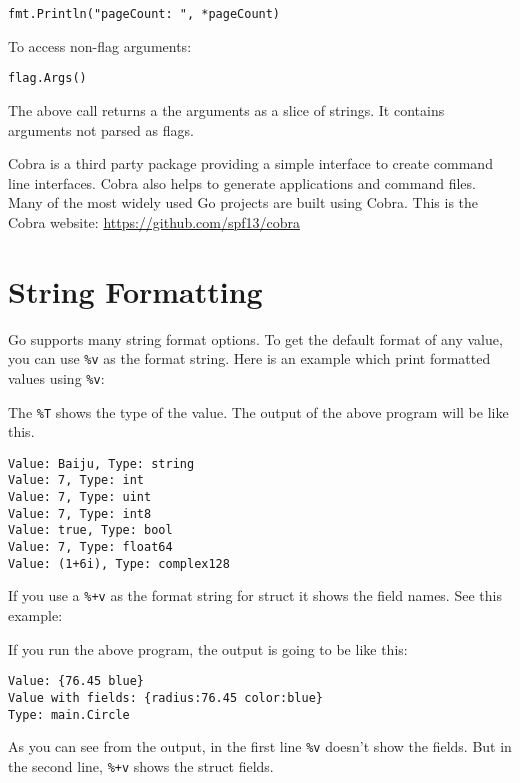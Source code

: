 \begin{lstlisting}[numbers=none]
fmt.Println("pageCount: ", *pageCount)
\end{lstlisting}

To access non-flag arguments:

\begin{lstlisting}[numbers=none]
flag.Args()
\end{lstlisting}

The above call returns a the arguments as a slice of strings.  It
contains arguments not parsed as flags.

Cobra is a third party package providing a simple interface to create
command line interfaces.  Cobra also helps to generate applications
and command files.  Many of the most widely used Go projects are built
using Cobra.  This is the Cobra
website: \url{https://github.com/spf13/cobra}

\section{String Formatting}

Go supports many string format options.  To
get the default format of any value, you can use \texttt{\%v} as the
format string.  Here is an example which print formatted values
using \texttt{\%v}:



The \texttt{\%T} shows the type of the value.  The output of the above
program will be like this.

\begin{lstlisting}[numbers=none]
Value: Baiju, Type: string
Value: 7, Type: int
Value: 7, Type: uint
Value: 7, Type: int8
Value: true, Type: bool
Value: 7, Type: float64
Value: (1+6i), Type: complex128
\end{lstlisting}

If you use a \texttt{\%+v} as the format string for struct it shows
the field names.  See this example:



If you run the above program, the output is going to be like this:

\begin{lstlisting}[numbers=none]
Value: {76.45 blue}
Value with fields: {radius:76.45 color:blue}
Type: main.Circle
\end{lstlisting}

As you can see from the output, in the first line \texttt{\%v} doesn't
show the fields.  But in the second line, \texttt{\%+v} shows the
struct fields.

